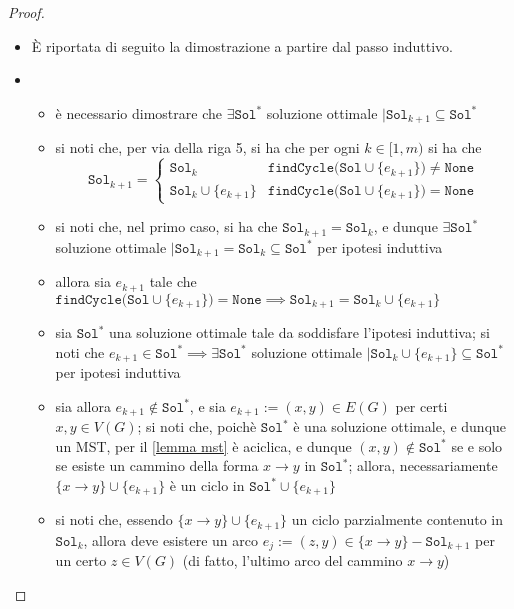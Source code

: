 \documentclass[a4paper, 12pt]{report}
\begin{document}
\begin{proof}
        \begin{itemize}
            \item[]  È riportata di seguito la dimostrazione a partire dal passo induttivo. 
            \item {}
                \begin{itemize}
                    \item è necessario dimostrare che $\exists \texttt{Sol}^*$ soluzione ottimale $\mid \texttt{Sol}_{k + 1} \subseteq \texttt{Sol}^*$
                    \item si noti che, per via della riga 5, si ha che per ogni $k \in [1, m)$ si ha che $$\texttt{Sol}_{k +1} = \left \{ \begin{array}{ll} \texttt{Sol}_k & \texttt{findCycle(Sol} \cup \{e_{k +1}\} \texttt{)} \neq \texttt{None} \\ \texttt{Sol}_k \cup \{e_{k +1}\} & \texttt{findCycle(Sol} \cup \{e_{k +1}\} \texttt{)} = \texttt{None} \end{array} \right.$$
                    \item si noti che, nel primo caso, si ha che $\texttt{Sol}_{k +1} = \texttt{Sol}_k$, e dunque $\exists \texttt{Sol}^*$ soluzione ottimale $\mid \texttt{Sol}_{k +1} = \texttt{Sol}_k \subseteq \texttt{Sol}^*$ per ipotesi induttiva
                    \item allora sia $e_{k + 1}$ tale che $\texttt{findCycle(Sol} \cup \{e_{k +1}\} \texttt{)} = \texttt{None} \implies \texttt{Sol}_{k +1} = \texttt{Sol}_k \cup \{e_{k +1}\}$
                    \item sia $\texttt{Sol}^*$ una soluzione ottimale tale da soddisfare l'ipotesi induttiva; si noti che $e_{k +1} \in \texttt{Sol}^* \implies \exists \texttt{Sol}^*$ soluzione ottimale $\mid \texttt{Sol}_k \cup \{ e_{k +1}\} \subseteq \texttt{Sol}^*$ per ipotesi induttiva
                    \item sia allora $e_{k +1} \notin \texttt{Sol}^*$, e sia $e_{k+1}:=(x, y) \in E(G)$ per certi $x, y \in V(G)$; si noti che, poichè $\texttt{Sol}^*$ è una soluzione ottimale, e dunque un MST, per il \cref{lemma mst} è aciclica, e dunque $(x, y) \notin \texttt{Sol}^*$ se e solo se esiste un cammino della forma $x \rightarrow y$ in $\texttt{Sol}^*$; allora, necessariamente $\{x \rightarrow y\} \cup \{e_{k +1}\}$ è un ciclo in $\texttt{Sol}^* \cup \{e_{k +1}\}$
                    \item si noti che, essendo $\{x \rightarrow y\} \cup \{e_{k +1}\}$ un ciclo parzialmente contenuto in $\texttt{Sol}_k$, allora deve esistere un arco $e_j := (z, y) \in \{x \rightarrow y\} - \texttt{Sol}_{k +1}$ per un certo $z \in V(G)$ (di fatto, l'ultimo arco del cammino $x \rightarrow y$)

\end{itemize}
\end{itemize}
\end{proof}
\end{document}

